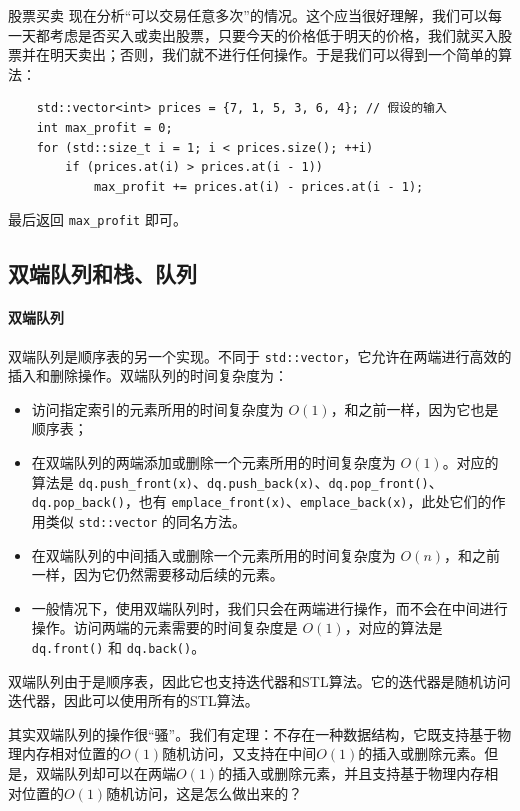 \begin{example}{股票买卖}{}
    现在分析“可以交易任意多次”的情况。这个应当很好理解，我们可以每一天都考虑是否买入或卖出股票，只要今天的价格低于明天的价格，我们就买入股票并在明天卖出；否则，我们就不进行任何操作。于是我们可以得到一个简单的算法：
    \begin{verbatim}
    std::vector<int> prices = {7, 1, 5, 3, 6, 4}; // 假设的输入
    int max_profit = 0;
    for (std::size_t i = 1; i < prices.size(); ++i) 
        if (prices.at(i) > prices.at(i - 1)) 
            max_profit += prices.at(i) - prices.at(i - 1);
    \end{verbatim}
    最后返回 \verb|max_profit| 即可。
\end{example}

\subsection{双端队列和栈、队列}

\paragraph{双端队列}

双端队列是顺序表的另一个实现。不同于 \verb|std::vector|，它允许在两端进行高效的插入和删除操作。双端队列的时间复杂度为：
\begin{itemize}
    \item 访问指定索引的元素所用的时间复杂度为 $O(1)$，和之前一样，因为它也是顺序表；
    \item 在双端队列的两端添加或删除一个元素所用的时间复杂度为 $O(1)$。对应的算法是 \verb|dq.push_front(x)|、\verb|dq.push_back(x)|、\verb|dq.pop_front()|、\verb|dq.pop_back()|，也有 \verb|emplace_front(x)|、\verb|emplace_back(x)|，此处它们的作用类似 \verb|std::vector| 的同名方法。
    \item 在双端队列的中间插入或删除一个元素所用的时间复杂度为 $O(n)$，和之前一样，因为它仍然需要移动后续的元素。
    \item 一般情况下，使用双端队列时，我们只会在两端进行操作，而不会在中间进行操作。访问两端的元素需要的时间复杂度是 $O(1)$，对应的算法是 \verb|dq.front()| 和 \verb|dq.back()|。
\end{itemize}

双端队列由于是顺序表，因此它也支持迭代器和STL算法。它的迭代器是随机访问迭代器，因此可以使用所有的STL算法。

其实双端队列的操作很“骚”。我们有定理：不存在一种数据结构，它既支持基于物理内存相对位置的$O(1)$随机访问，又支持在中间$O(1)$的插入或删除元素。但是，双端队列却可以在两端$O(1)$的插入或删除元素，并且支持基于物理内存相对位置的$O(1)$随机访问，这是怎么做出来的？

